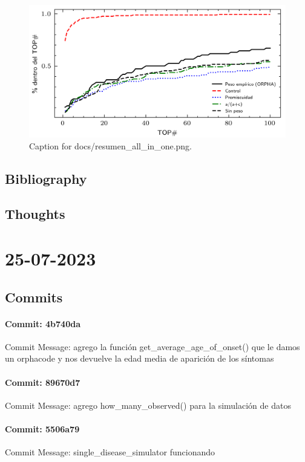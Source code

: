 \documentclass{article}
\begin{document}
\begin{figure}[h] \centering \includegraphics{docs/resumen_all_in_one.png} \caption{Caption for docs/resumen_all_in_one.png.} \end{figure}
\subsection{Bibliography}
\subsection{Thoughts}

\section{25-07-2023}
\subsection{Commits}
\paragraph{Commit: 4b740da}
Commit Message: agrego la función get_average_age_of_onset() que le damos un orphacode y nos devuelve la edad media de aparición de los síntomas

\paragraph{Commit: 89670d7}
Commit Message: agrego how_many_observed() para la simulación de datos

\paragraph{Commit: 5506a79}
Commit Message: single_disease_simulator funcionando
\end{document}
